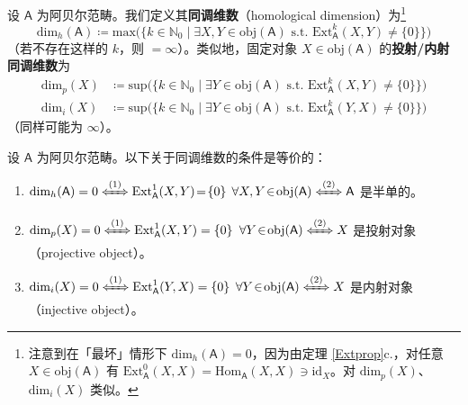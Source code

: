\begin{Def}
	设 $\mathsf{A}$ 为阿贝尔范畴。我们定义其\textbf{同调维数}（homological dimension）为\footnote{注意到在「最坏」情形下 $\text{dim}_h(\mathsf{A})=0$，因为由定理 \ref{Extprop}c.，对任意 $X\in\text{obj}(\mathsf{A})$ 有 $\text{Ext}_\mathsf{A}^0(X,X)=\text{Hom}_\mathsf{A}(X,X)\ni\text{id}_X$。对 $\text{dim}_p(X)$、$\text{dim}_i(X)$ 类似。} 
	\begin{equation}\label{homologicaldimension}
		\text{dim}_h(\mathsf{A})\coloneqq\text{max}\big(\{k\in\mathbb{N}_0\mid \exists X,Y\in\text{obj}(\mathsf{A})\text{ s.t. }\text{Ext}_\mathsf{A}^k(X,Y)\neq\{0\}\}\big)
	\end{equation}
	（若不存在这样的 $k$，则 $=\infty$）。类似地，固定对象 $X\in\text{obj}(\mathsf{A})$ 的\textbf{投射/内射同调维数}为 
	\begin{equation}
		\begin{aligned}
			\text{dim}_p(X)&\coloneqq\text{sup}\big(\{k\in\mathbb{N}_0\mid \exists Y\in\text{obj}(\mathsf{A})\text{ s.t. }\text{Ext}_\mathsf{A}^k(X,Y)\neq\{0\}\}\big) \\
			\text{dim}_i(X)&\coloneqq\text{sup}\big(\{k\in\mathbb{N}_0\mid \exists Y\in\text{obj}(\mathsf{A})\text{ s.t. }\text{Ext}_\mathsf{A}^k(Y,X)\neq\{0\}\}\big)
		\end{aligned}
	\end{equation}
	（同样可能为 $\infty$）。    
\end{Def}


\begin{Pro}\label{injprojExt}
	设 $\mathsf{A}$ 为阿贝尔范畴。以下关于同调维数的条件是等价的：
	\renewcommand{\theenumi}{\roman{enumi}}
	\begin{enumerate}[leftmargin=0.5cm]
		\item $\textup{dim}_h(\mathsf{A})=0 \xLeftrightarrow{(1)} \textup{Ext}_\mathsf{A}^1(X,Y)\!=\!\{0\}$ $\forall X,Y\!\in\!\textup{obj}(\mathsf{A}) \xLeftrightarrow{(2)} \mathsf{A}$ 是半单的。
		
		\item $\textup{dim}_p(X)=0 \xLeftrightarrow{(1)} \textup{Ext}_\mathsf{A}^1(X,Y)=\{0\}$ $\forall Y\!\in\!\textup{obj}(\mathsf{A}) \xLeftrightarrow{(2)} X$ 是投射对象（projective object）。
		
		\item $\textup{dim}_i(X)=0 \xLeftrightarrow{(1)} \textup{Ext}_\mathsf{A}^1(Y,X)=\{0\}$ $\forall Y\!\in\!\textup{obj}(\mathsf{A}) \xLeftrightarrow{(2)} X$ 是内射对象（injective object）。
	\end{enumerate}
\end{Pro}

